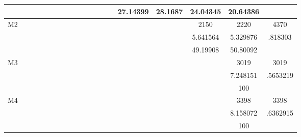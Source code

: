 \begin{table}
{\begin{tabular}{c|cccccccccccccccccc}
            &          &          &          &          &          &          &          &          &          &          &          &          &          &    27.14399&     28.1687&    24.04345&    20.64386&          \\\midrule
\multirow{3}{*}{M2}            &          &          &          &          &          &          &          &          &          &          &          &          &          &          &          &        2150&        2220&        4370\\
            &          &          &          &          &          &          &          &          &          &          &          &          &          &          &          &    5.641564&    5.329876&     .818303\\
            &          &          &          &          &          &          &          &          &          &          &          &          &          &          &          &    49.19908&    50.80092&          \\\midrule
\multirow{3}{*}{M3}            &          &          &          &          &          &          &          &          &          &          &          &          &          &          &          &          &        3019&        3019\\
            &          &          &          &          &          &          &          &          &          &          &          &          &          &          &          &          &    7.248151&    .5653219\\
            &          &          &          &          &          &          &          &          &          &          &          &          &          &          &          &          &         100&          \\\midrule
\multirow{3}{*}{M4}            &          &          &          &          &          &          &          &          &          &          &          &          &          &          &          &          &        3398&        3398\\
            &          &          &          &          &          &          &          &          &          &          &          &          &          &          &          &          &    8.158072&    .6362915\\
            &          &          &          &          &          &          &          &          &          &          &          &          &          &          &          &          &         100&          \\\midrule

\end{tabular}}
\end{table}

